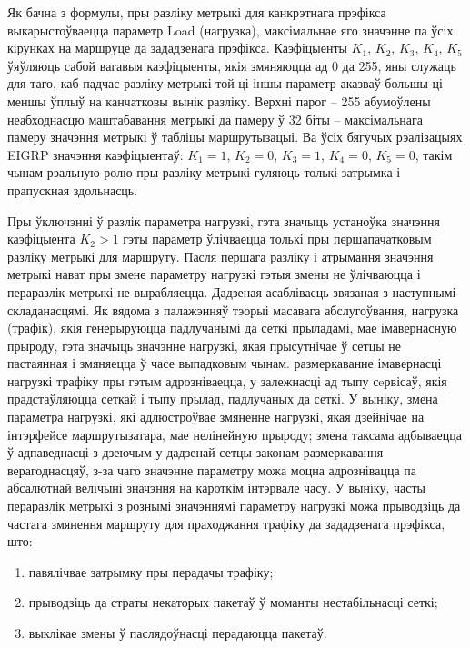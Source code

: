 Як бачна з формулы, пры разліку метрыкі для канкрэтнага прэфікса
выкарыстоўваецца параметр Load (нагрузка), максімальнае яго значэнне па ўсіх кірунках на маршруце да зададзенага прэфікса.
Каэфіцыенты $K_1$, $K_2$, $K_3$, $K_4$, $K_5$ ўяўляюць сабой вагавыя
каэфіцыенты, якія змяняюцца ад 0 да 255, яны служаць для таго, каб падчас разліку метрыкі
той ці іншы параметр аказваў большы ці меншы ўплыў на канчатковы
вынік разліку. Верхні парог -- 255 абумоўлены неабходнасцю маштабавання метрыкі да памеру ў 32 біты -- максімальнага памеру значэння
метрыкі ў табліцы маршрутызацыі. Ва ўсіх бягучых рэалізацыях EIGRP значэння
каэфіцыентаў: $K_1 = 1$, $K_2 = 0$, $K_3 = 1$, $K_4 = 0$, $K_5 = 0$, такім чынам рэальную ролю пры разліку
метрыкі гуляюць толькі затрымка і прапускная здольнасць.

Пры ўключэнні ў разлік параметра нагрузкі, гэта значыць устаноўка значэння
каэфіцыента $K_2 > 1$ гэты параметр ўлічваецца толькі пры першапачатковым
разліку метрыкі для маршруту. Пасля першага разліку і атрымання значэння
метрыкі нават пры змене параметру нагрузкі гэтыя змены не ўлічваюцца
і пераразлік метрыкі не вырабляецца. Дадзеная асаблівасць звязаная з наступнымі складанасцямі. Як вядома з палажэнняў тэорыі масавага абслугоўвання, нагрузка (трафік), якія генерыруюцца падлучанымі да сеткі прыладамі,
мае імавернасную прыроду, гэта значыць значэнне нагрузкі, якая прысутнічае ў сетцы
не пастаянная і змяняецца ў часе выпадковым чынам. размеркаванне імавернасці нагрузкі трафіку пры гэтым адрозніваецца, у залежнасці
ад тыпу сeрвісаў, якія прадстаўляюцца сеткай і тыпу прылад, падлучаных
да сеткі. У выніку, змена параметра нагрузкі, які адлюстроўвае змяненне
нагрузкі, якая дзейнічае на інтэрфейсе маршрутызатара, мае нелінейную
прыроду; змена таксама адбываецца ў адпаведнасці з дзеючым у дадзенай
сетцы законам размеркавання верагоднасцяў, з-за чаго значэнне параметру можа моцна адрознівацца па абсалютнай велічыні значэння на
кароткім інтэрвале часу. У выніку, часты пераразлік метрыкі з рознымі значэннямі параметру нагрузкі можа прыводзіць да частага
змянення маршруту для праходжання трафіку да зададзенага прэфікса, што:
\begin{enumerate}
    \item павялічвае затрымку пры перадачы трафіку;
    \item прыводзіць да страты некаторых пакетаў ў моманты нестабільнасці сеткі;
    \item выклікае змены ў паслядоўнасці перадаюцца пакетаў.
\end{enumerate}

